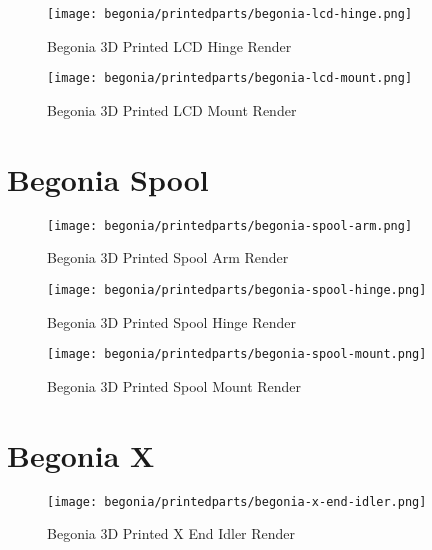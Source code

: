\begin{figure}[H]
\centering
\texttt{[image: begonia/printedparts/begonia-lcd-hinge.png]}
\caption{Begonia 3D Printed LCD Hinge Render}
\label{fig:beglcdhinge}
\end{figure}

\begin{figure}[H]
\centering
\texttt{[image: begonia/printedparts/begonia-lcd-mount.png]}
\caption{Begonia 3D Printed LCD Mount Render}
\label{fig:beglcdmount}
\end{figure}


\section{Begonia Spool}

\begin{figure}[H]
\centering
\texttt{[image: begonia/printedparts/begonia-spool-arm.png]}
\caption{Begonia 3D Printed Spool Arm Render}
\label{fig:begspoolarm}
\end{figure}

\begin{figure}[H]
\centering
\texttt{[image: begonia/printedparts/begonia-spool-hinge.png]}
\caption{Begonia 3D Printed Spool Hinge Render}
\label{fig:begspoolhinge}
\end{figure}

\begin{figure}[H]
\centering
\texttt{[image: begonia/printedparts/begonia-spool-mount.png]}
\caption{Begonia 3D Printed Spool Mount Render}
\label{fig:begspoolmount}
\end{figure}


\section{Begonia X}

\begin{figure}[H]
\centering
\texttt{[image: begonia/printedparts/begonia-x-end-idler.png]}
\caption{Begonia 3D Printed X End Idler Render}
\label{fig:begxendidler}
\end{figure}

